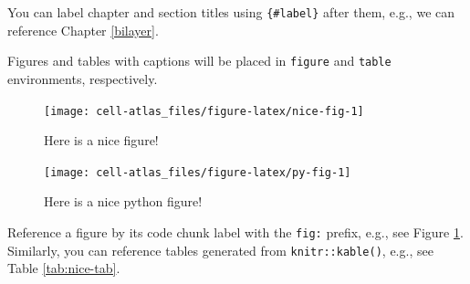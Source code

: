 \documentclass[]{tufte-book}
\begin{document}
You can label chapter and section titles using \texttt{\{\#label\}}
after them, e.g., we can reference Chapter \ref{bilayer}.

Figures and tables with captions will be placed in \texttt{figure} and
\texttt{table} environments, respectively.

\begin{figure}

{\centering \texttt{[image: cell-atlas\_files/figure-latex/nice-fig-1]} 

}

\caption[Here is a nice figure!]{Here is a nice figure!}\label{fig:nice-fig}
\end{figure}

\begin{figure}

{\centering \texttt{[image: cell-atlas\_files/figure-latex/py-fig-1]} 

}

\caption[Here is a nice python figure!]{Here is a nice python figure!}\label{fig:py-fig}
\end{figure}

Reference a figure by its code chunk label with the \texttt{fig:}
prefix, e.g., see Figure \ref{fig:nice-fig}. Similarly, you can
reference tables generated from \texttt{knitr::kable()}, e.g., see Table
\ref{tab:nice-tab}.
\end{document}

